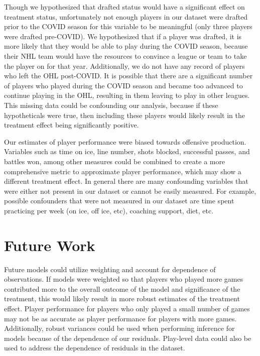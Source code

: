 \documentclass[12pt]{article}
\begin{document}
Though we hypothesized that drafted status would have a significant
effect on treatment status, unfortunately not enough players in our
dataset were drafted prior to the COVID season for this variable to be
meaningful (only three players were drafted pre-COVID). We hypothesized
that if a player was drafted, it is more likely that they would be able
to play during the COVID season, because their NHL team would have the
resources to convince a league or team to take the player on for that
year. Additionally, we do not have any record of players who left the
OHL post-COVID. It is possible that there are a significant number of
players who played during the COVID season and became too advanced to
continue playing in the OHL, resulting in them leaving to play in other
leagues. This missing data could be confounding our analysis, because if
these hypotheticals were true, then including these players would likely
result in the treatment effect being significantly positive.

Our estimates of player performance were biased towards offensive
production. Variables such as time on ice, line number, shots blocked,
successful passes, and battles won, among other measures could be
combined to create a more comprehensive metric to approximate player
performance, which may show a different treatment effect. In general
there are many confounding variables that were either not present in our
dataset or cannot be easily measured. For example, possible confounders
that were not measured in our dataset are time spent practicing per week
(on ice, off ice, etc), coaching support, diet, etc.

\hypertarget{future-work}{%
\section{Future Work}\label{future-work}}

Future models could utilize weighting and account for dependence of
observations. If models were weighted so that players who played more
games contributed more to the overall outcome of the model and
significance of the treatment, this would likely result in more robust
estimates of the treatment effect. Player performance for players who
only played a small number of games may not be as accurate as player
performance for players with more games. Additionally, robust variances
could be used when performing inference for models because of the
dependence of our residuals. Play-level data could also be used to
address the dependence of residuals in the dataset.
\end{document}
